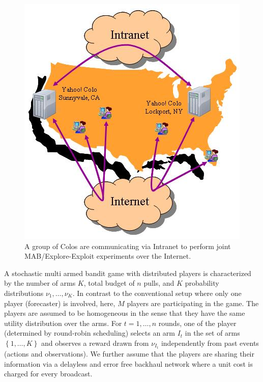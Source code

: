 \documentclass{sig-alternate}
\newcommand{\set}[1]{\left\{#1\right\}}
\begin{document}
\begin{figure}[t]
\centering
\includegraphics[scale=0.75]{figures/US_Colos.jpg}
\caption{A group of Colos are communicating via Intranet to perform joint MAB/Explore-Exploit experiments over the Internet.}
\label{fig: colos}
\end{figure}

A stochastic multi armed bandit game with distributed players is characterized by the number of arms $K$, total budget of $n$ pulls, and $K$ probability distributions $\nu_1,\ldots,\nu_K$. In contrast to the conventional setup where only one player (forecaster) is involved, here, $M$ players are participating in the game. The players are assumed to be homogeneous in the sense that they have the same utility distribution over the arms. For $t=1,\ldots,n$ rounds, one of the player (determined by round-robin scheduling) selects an arm $I_t$ in the set of arms $\set{1,\ldots,K}$ and observes a reward drawn from $\nu_{I_t}$ independently from past events (actions and observations). We further assume that the players are sharing their information via a delayless and error free backhaul network where a unit cost is charged for every broadcast. 
\end{document}
